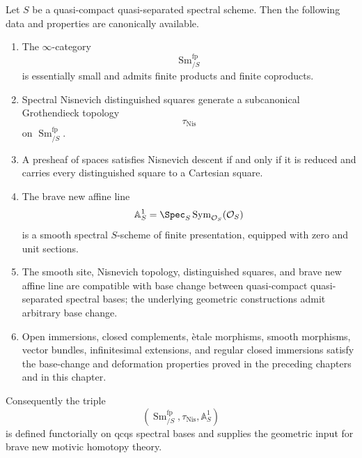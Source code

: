 \begin{theorem}
\label{thm:motivic-input-package}
Let $S$ be a quasi-compact quasi-separated spectral scheme. Then the
following data and properties are canonically available.
\begin{enumerate}[label=(\roman*)]
    \item The $\infty$-category
    \[
        \operatorname{Sm}^{\mathrm{fp}}_{/S}
    \]
    is essentially small and admits finite products and finite coproducts.

    \item Spectral Nisnevich distinguished squares generate a
    subcanonical Grothendieck topology
    \[
        \tau_{\mathrm{Nis}}
    \]
    on $\operatorname{Sm}^{\mathrm{fp}}_{/S}$.

    \item A presheaf of spaces satisfies Nisnevich descent if and only if
    it is reduced and carries every distinguished square to a Cartesian
    square.

    \item The brave new affine line
    \[
        \mathbb A^1_S
        =
        \Spec_S
        \operatorname{Sym}_{\mathcal O_S}(\mathcal O_S)
    \]
    is a smooth spectral $S$-scheme of finite presentation, equipped with
    zero and unit sections.

    \item The smooth site, Nisnevich topology, distinguished squares, and
    brave new affine line are compatible with base change between quasi-compact quasi-separated
    spectral bases; the underlying geometric constructions admit arbitrary base change.

    \item Open immersions, closed complements, \`etale morphisms, smooth
    morphisms, vector bundles, infinitesimal extensions, and regular closed
    immersions satisfy the base-change and deformation properties proved
    in the preceding chapters and in this chapter.
\end{enumerate}
Consequently the triple
\[
    \left(
        \operatorname{Sm}^{\mathrm{fp}}_{/S},
        \tau_{\mathrm{Nis}},
        \mathbb A^1_S
    \right)
\]
is defined functorially on qcqs spectral bases and supplies the geometric input for brave
new motivic homotopy theory.
\end{theorem}

